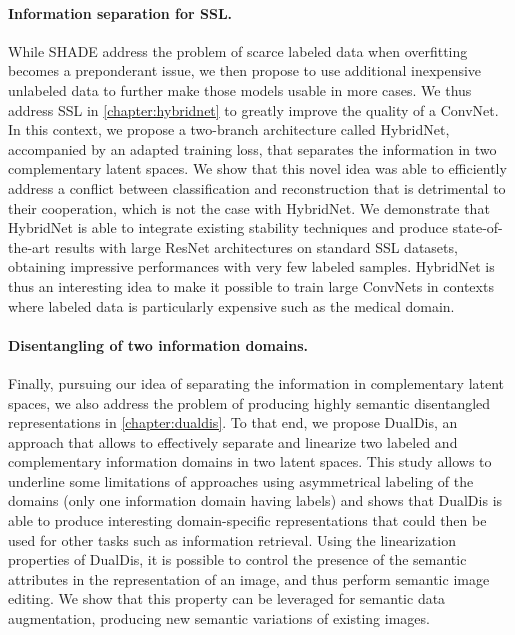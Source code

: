 \paragraph{Information separation for \acf{SSL}.}
While \ac{SHADE} address the problem of scarce labeled data when overfitting becomes a preponderant issue, we then propose to use additional inexpensive unlabeled data to further make those models usable in more cases. We thus address \acf{SSL} in \autoref{chapter:hybridnet} to greatly improve the quality of a \ac{ConvNet}. In this context, we propose a two-branch architecture called HybridNet, accompanied by an adapted training loss, that separates the information in two complementary latent spaces. We show that this novel idea was able to efficiently address a conflict between classification and reconstruction that is detrimental to their cooperation, which is not the case with HybridNet. We demonstrate that HybridNet is able to integrate existing stability techniques and produce state-of-the-art results with large ResNet architectures on standard \ac{SSL} datasets, obtaining impressive performances with very few labeled samples. HybridNet is thus an interesting idea to make it possible to train large \acp{ConvNet} in contexts where labeled data is particularly expensive such as the medical domain.


\paragraph{Disentangling of two information domains.} Finally, pursuing our idea of separating the information in complementary latent spaces, we also address the problem of producing highly semantic disentangled representations in \autoref{chapter:dualdis}. To that end, we propose DualDis, an approach that allows to effectively separate and linearize two labeled and complementary information domains in two latent spaces. This study allows to underline some limitations of approaches using asymmetrical labeling of the domains (\ie only one information domain having labels) and shows that DualDis is able to produce interesting domain-specific representations that could then be used for other tasks such as information retrieval. Using the linearization properties of DualDis, it is possible to control the presence of the semantic attributes in the representation of an image, and thus perform semantic image editing. We show that this property can be leveraged for semantic data augmentation, producing new semantic variations of existing images.


